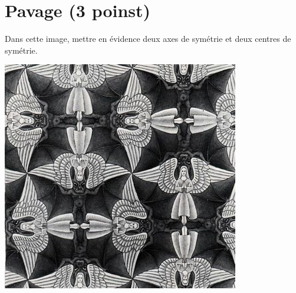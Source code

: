 \section{Pavage (3 poinst)}

\begin{questions}
	\question[3] Dans cette image, mettre en évidence deux axes de symétrie et deux centres de symétrie.
\end{questions}


\begin{center}
	\includegraphics[scale=0.5]{img/anges}
\end{center}